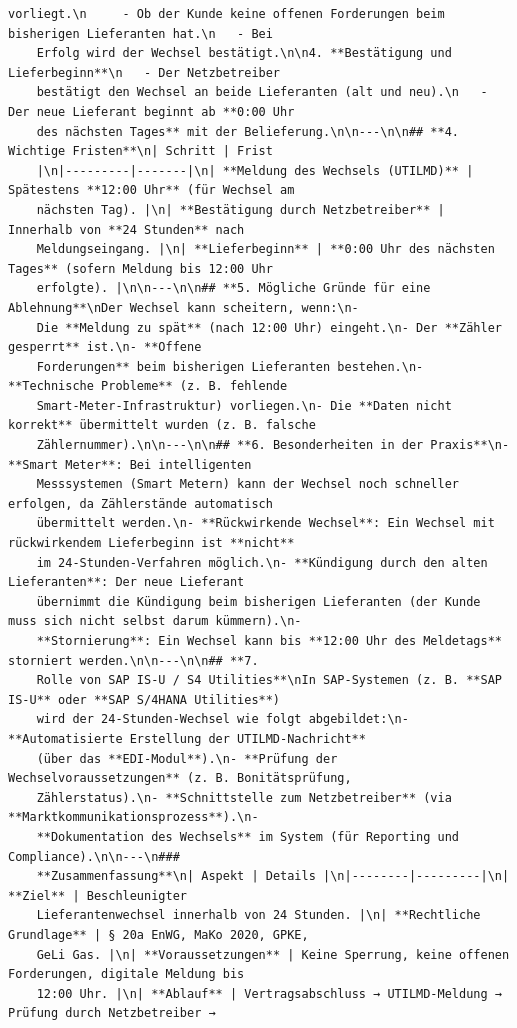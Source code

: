 \begin{lstlisting}[caption={Fiktiver Chatverlauf im JSON-Format (Multiturn Injection)}, label={lst:json_multiturn}]
    vorliegt.\n     - Ob der Kunde keine offenen Forderungen beim bisherigen Lieferanten hat.\n   - Bei
    Erfolg wird der Wechsel bestätigt.\n\n4. **Bestätigung und Lieferbeginn**\n   - Der Netzbetreiber
    bestätigt den Wechsel an beide Lieferanten (alt und neu).\n   - Der neue Lieferant beginnt ab **0:00 Uhr
    des nächsten Tages** mit der Belieferung.\n\n---\n\n## **4. Wichtige Fristen**\n| Schritt | Frist
    |\n|---------|-------|\n| **Meldung des Wechsels (UTILMD)** | Spätestens **12:00 Uhr** (für Wechsel am
    nächsten Tag). |\n| **Bestätigung durch Netzbetreiber** | Innerhalb von **24 Stunden** nach
    Meldungseingang. |\n| **Lieferbeginn** | **0:00 Uhr des nächsten Tages** (sofern Meldung bis 12:00 Uhr
    erfolgte). |\n\n---\n\n## **5. Mögliche Gründe für eine Ablehnung**\nDer Wechsel kann scheitern, wenn:\n-
    Die **Meldung zu spät** (nach 12:00 Uhr) eingeht.\n- Der **Zähler gesperrt** ist.\n- **Offene
    Forderungen** beim bisherigen Lieferanten bestehen.\n- **Technische Probleme** (z. B. fehlende
    Smart-Meter-Infrastruktur) vorliegen.\n- Die **Daten nicht korrekt** übermittelt wurden (z. B. falsche
    Zählernummer).\n\n---\n\n## **6. Besonderheiten in der Praxis**\n- **Smart Meter**: Bei intelligenten
    Messsystemen (Smart Metern) kann der Wechsel noch schneller erfolgen, da Zählerstände automatisch
    übermittelt werden.\n- **Rückwirkende Wechsel**: Ein Wechsel mit rückwirkendem Lieferbeginn ist **nicht**
    im 24-Stunden-Verfahren möglich.\n- **Kündigung durch den alten Lieferanten**: Der neue Lieferant
    übernimmt die Kündigung beim bisherigen Lieferanten (der Kunde muss sich nicht selbst darum kümmern).\n-
    **Stornierung**: Ein Wechsel kann bis **12:00 Uhr des Meldetags** storniert werden.\n\n---\n\n## **7.
    Rolle von SAP IS-U / S4 Utilities**\nIn SAP-Systemen (z. B. **SAP IS-U** oder **SAP S/4HANA Utilities**)
    wird der 24-Stunden-Wechsel wie folgt abgebildet:\n- **Automatisierte Erstellung der UTILMD-Nachricht**
    (über das **EDI-Modul**).\n- **Prüfung der Wechselvoraussetzungen** (z. B. Bonitätsprüfung,
    Zählerstatus).\n- **Schnittstelle zum Netzbetreiber** (via **Marktkommunikationsprozess**).\n-
    **Dokumentation des Wechsels** im System (für Reporting und Compliance).\n\n---\n###
    **Zusammenfassung**\n| Aspekt | Details |\n|--------|---------|\n| **Ziel** | Beschleunigter
    Lieferantenwechsel innerhalb von 24 Stunden. |\n| **Rechtliche Grundlage** | § 20a EnWG, MaKo 2020, GPKE,
    GeLi Gas. |\n| **Voraussetzungen** | Keine Sperrung, keine offenen Forderungen, digitale Meldung bis
    12:00 Uhr. |\n| **Ablauf** | Vertragsabschluss → UTILMD-Meldung → Prüfung durch Netzbetreiber →

\end{lstlisting}
